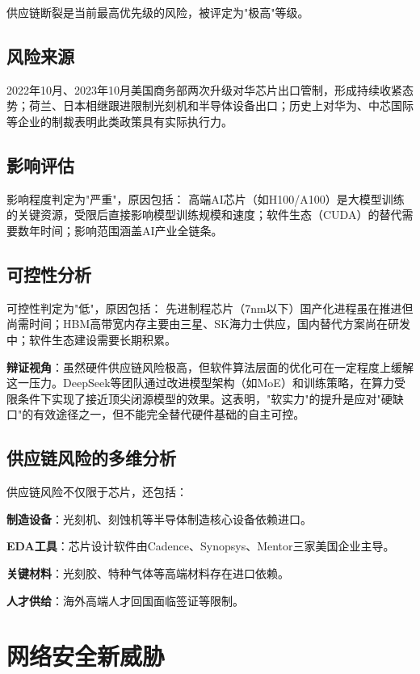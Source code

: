 供应链断裂是当前最高优先级的风险，被评定为"极高"等级。

\subsection{风险来源}

2022年10月、2023年10月美国商务部两次升级对华芯片出口管制，形成持续收紧态势；荷兰、日本相继跟进限制光刻机和半导体设备出口；历史上对华为、中芯国际等企业的制裁表明此类政策具有实际执行力。

\subsection{影响评估}

影响程度判定为"严重"，原因包括：
高端AI芯片（如H100/A100）是大模型训练的关键资源，受限后直接影响模型训练规模和速度；软件生态（CUDA）的替代需要数年时间；影响范围涵盖AI产业全链条。

\subsection{可控性分析}

可控性判定为"低"，原因包括：
先进制程芯片（7nm以下）国产化进程虽在推进但尚需时间；HBM高带宽内存主要由三星、SK海力士供应，国内替代方案尚在研发中；软件生态建设需要长期积累。

\textbf{辩证视角}：虽然硬件供应链风险极高，但软件算法层面的优化可在一定程度上缓解这一压力。DeepSeek等团队通过改进模型架构（如MoE）和训练策略，在算力受限条件下实现了接近顶尖闭源模型的效果。这表明，"软实力"的提升是应对"硬缺口"的有效途径之一，但不能完全替代硬件基础的自主可控。

\subsection{供应链风险的多维分析}

供应链风险不仅限于芯片，还包括：

\textbf{制造设备}：光刻机、刻蚀机等半导体制造核心设备依赖进口。

\textbf{EDA工具}：芯片设计软件由Cadence、Synopsys、Mentor三家美国企业主导。

\textbf{关键材料}：光刻胶、特种气体等高端材料存在进口依赖。

\textbf{人才供给}：海外高端人才回国面临签证等限制。

\section{网络安全新威胁}

